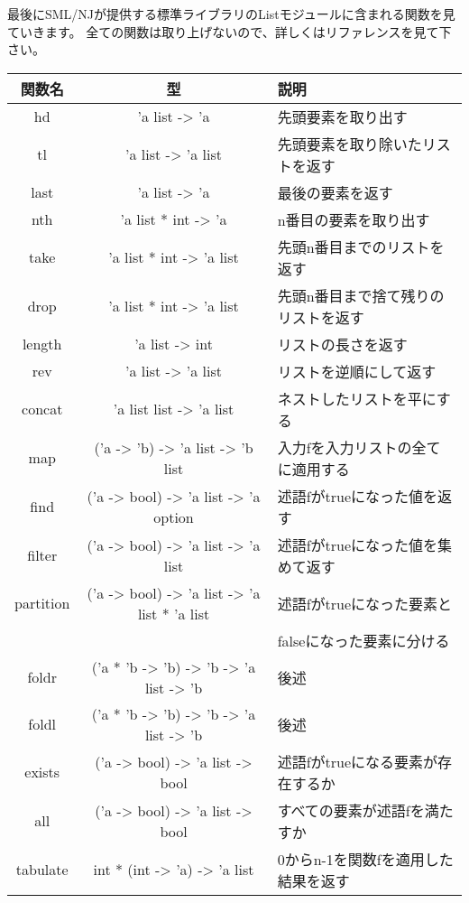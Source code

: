 \documentclass[11pt,a4paper]{article}
\begin{document}
最後にSML/NJが提供する標準ライブラリのListモジュールに含まれる関数を見ていきます。
全ての関数は取り上げないので、詳しくはリファレンスを見て下さい\cite{sml-libs}。

\begin{table}[htb]
  \begin{tabular}{|c|c|l|}
\hline
関数名 & 型 & 説明 \\ \hline \hline
hd & 'a list -> 'a                                         & 先頭要素を取り出す\\ \hline
tl & 'a list -> 'a list                                    & 先頭要素を取り除いたリストを返す\\ \hline
last & 'a list -> 'a                                       & 最後の要素を返す\\ \hline
nth & 'a list * int -> 'a                                  & n番目の要素を取り出す\\ \hline
take & 'a list * int -> 'a list                            & 先頭n番目までのリストを返す\\ \hline
drop & 'a list * int -> 'a list                            & 先頭n番目まで捨て残りのリストを返す\\ \hline
length & 'a list -> int                                    & リストの長さを返す\\ \hline
rev & 'a list -> 'a list                                   & リストを逆順にして返す\\ \hline
concat & 'a list list -> 'a list                           & ネストしたリストを平にする\\ \hline
map & ('a -> 'b) -> 'a list -> 'b list                     & 入力fを入力リストの全てに適用する\\ \hline
find & ('a -> bool) -> 'a list -> 'a option                & 述語fがtrueになった値を返す\\ \hline
filter & ('a -> bool) -> 'a list -> 'a list                & 述語fがtrueになった値を集めて返す\\ \hline
partition & ('a -> bool) -> 'a list -> 'a list * 'a list   & 述語fがtrueになった要素と\\
          &                                                & falseになった要素に分ける\\ \hline
foldr & ('a * 'b -> 'b) -> 'b -> 'a list -> 'b             & 後述\\ \hline
foldl & ('a * 'b -> 'b) -> 'b -> 'a list -> 'b             & 後述\\ \hline
exists & ('a -> bool) -> 'a list -> bool                   & 述語fがtrueになる要素が存在するか\\ \hline
all & ('a -> bool) -> 'a list -> bool                      & すべての要素が述語fを満たすか\\ \hline
tabulate & int * (int -> 'a) -> 'a list                    & 0からn-1を関数fを適用した結果を返す\\ \hline
  \end{tabular}
\end{table}
\end{document}
